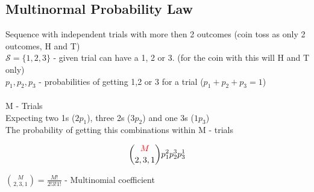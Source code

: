 \subsection{Multinormal Probability Law}

Sequence with independent trials with {\color{red}more then 2 outcomes} (coin toss as only 2 outcomes, H and T)\\
{\color{red}$\mathcal{S}=\{1,2,3\}$} - given trial can have a 1, 2 or 3. (for the coin with this will H and T only)\\
{\color{red}$p_{1},p_{2},p_{3}$ - probabilities} of getting 1,2 or 3 for a trial  ($p_{1}+p_{2}+p_{3}=1$)\\\\

M - Trials\\
Expecting {\color{red}two 1s} ($2p_{1}$), {\color{blue}three 2s} ($3p_{2}$) and {\color{green}one 3s} ($1p_{3}$)\\
The probability of getting this combinations within {\color{red}M - trials} 

\begin{equation*}
	\binom{{\color{red}M}}{2,3,1}p_{1}^{2}p_{2}^{3}p_{3}^{1}
\end{equation*}

{\color{blue}$\binom{M}{2,3,1} = \frac{M!}{2!3!1!}$ - Multinomial coefficient} 
